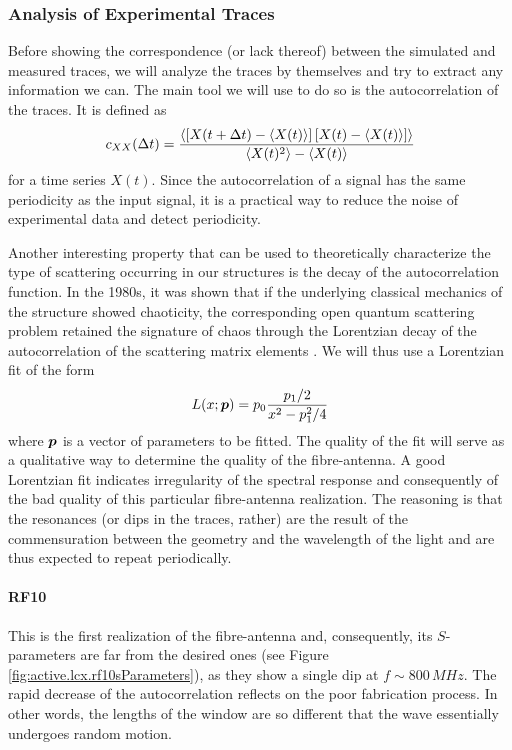 \subsubsection{Analysis of Experimental Traces}
Before showing the correspondence (or lack thereof) between the
simulated and measured traces, we will analyze the traces by themselves
and try to extract any information we can. The main tool 
we will use to do so is the autocorrelation of the traces. It is defined
as 
	\begin{equation}
		c_{XX}(\Delta t) = \frac{\left\langle\left[X(t+\Delta t)-\left\langle X(t)\right\rangle\right]\left[X(t)-\left\langle X(t)\right\rangle\right]\right\rangle}{\left\langle X(t)^2\right\rangle-\left\langle X(t)\right\rangle}
	\end{equation}
for a time series $X(t)$. Since the autocorrelation of a signal has the same periodicity
as the input signal, it is a practical way to reduce the noise of experimental
data and detect periodicity. 

Another interesting property that can be used to theoretically characterize
the type of scattering occurring in our structures is the decay of the 
autocorrelation function. In the 1980s, it was shown that if the underlying
classical mechanics of the structure showed chaoticity, the corresponding
open quantum scattering problem retained the signature of chaos 
through the Lorentzian decay of the autocorrelation of the scattering matrix 
elements \cite{BLU1988}. We will thus use a Lorentzian fit of the form 
	\begin{equation}
		L(x;\boldsymbol{p}) = p_0 \frac{p_1/2}{x^2-p_1^2/4}
	\end{equation}
where $\boldsymbol{p}$ is a vector of parameters to be fitted. The quality of the
fit will serve as a qualitative way to determine the quality of the
fibre-antenna. A good Lorentzian fit indicates irregularity of the spectral
response and consequently of the bad quality of this particular fibre-antenna
realization. The reasoning is that the resonances (or dips in the traces, rather) are the result
of the commensuration between the geometry and the wavelength of the light and 
are thus expected to repeat periodically. 

\paragraph{RF10}
This is the first realization of the fibre-antenna and, 
consequently, its $S$-parameters are far from the desired
ones (see Figure \ref{fig:active.lcx.rf10sParameters}), as they
show a single dip at $f\sim800\,\unit{MHz}$. The rapid decrease
of the autocorrelation reflects on the poor fabrication process.
In other words, the lengths of the window are so different
that the wave essentially undergoes random motion. 

